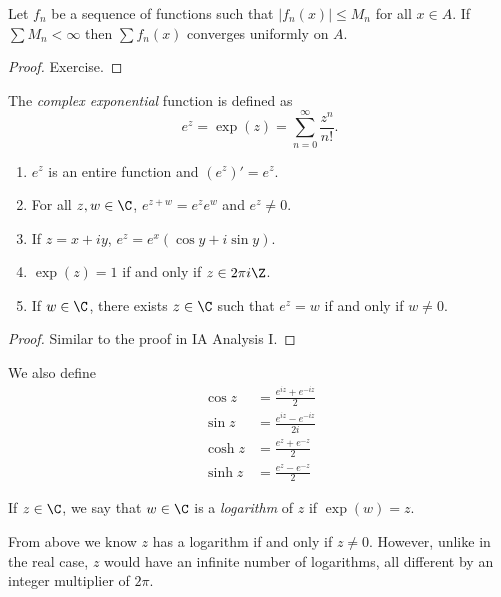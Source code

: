 \documentclass[a4paper]{article}
\begin{document}
\begin{proposition}
  Let \(f_n\) be a sequence of functions such that \(|f_n(x)| \leq M_n\) for all \(x \in A\). If \(\sum M_n < \infty\) then \(\sum f_n(x)\) converges uniformly on \(A\).
\end{proposition}

\begin{proof}
  Exercise.
\end{proof}

\begin{definition}[Exponential]
  The \emph{complex exponential} function is defined as
  \[
    e^z = \exp(z) = \sum_{n = 0}^\infty \frac{z^n}{n!}.
  \]
\end{definition}

\begin{proposition}\leavevmode
  \begin{enumerate}
  \item \(e^z\) is an entire function and \((e^z)' = e^z\).
  \item For all \(z, w \in \C\), \(e^{z + w} = e^ze^w\) and \(e^z \neq 0\).
  \item If \(z = x+ iy\), \(e^z = e^x (\cos y + i \sin y)\).
  \item \(\exp(z) = 1\) if and only if \(z \in 2\pi i \Z\).
  \item If \(w \in \C\), there exists \(z \in \C\) such that \(e^z = w\) if and only if \(w \neq 0\).
  \end{enumerate}
\end{proposition}

\begin{proof}
  Similar to the proof in IA Analysis I.
\end{proof}

We also define
\begin{align*}
  \cos z &= \frac{e^{iz} + e^{-iz}}{2} \\
  \sin z &= \frac{e^{iz} - e^{-iz}}{2i} \\
  \cosh z &= \frac{e^z + e^{-z}}{2} \\
  \sinh z &= \frac{e^z - e^{-z}}{2}
\end{align*}

\begin{definition}[Logarithm]
  If \(z \in \C\), we say that \(w \in \C\) is a \emph{logarithm} of \(z\) if \(\exp(w) = z\).
\end{definition}

From above we know \(z\) has a logarithm if and only if \(z \neq 0\). However, unlike in the real case, \(z\) would have an infinite number of logarithms, all different by an integer multiplier of \(2\pi\).
\end{document}
